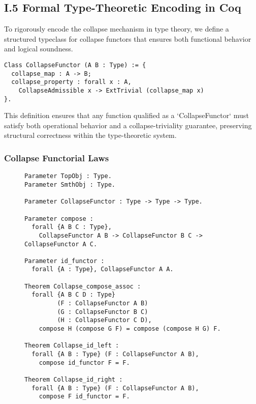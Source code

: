 \documentclass[11pt]{article}
\begin{document}
\subsection*{I.5 Formal Type-Theoretic Encoding in Coq}

To rigorously encode the collapse mechanism in type theory, we define a structured typeclass for collapse functors that ensures both functional behavior and logical soundness.

\begin{lstlisting}[language=Coq, caption={CollapseFunctor as a Typeclass with Structural Guarantees}]
Class CollapseFunctor (A B : Type) := {
  collapse_map : A -> B;
  collapse_property : forall x : A,
    CollapseAdmissible x -> ExtTrivial (collapse_map x)
}.
\end{lstlisting}

This definition ensures that any function qualified as a `CollapseFunctor` must satisfy both operational behavior and a collapse-triviality guarantee, preserving structural correctness within the type-theoretic system.


\subsubsection*{Collapse Functorial Laws}

\begin{figure}[H]
\centering
\begin{lstlisting}[language=Coq, mathescape=false, caption={Collapse Functorial Laws in Coq}]
Parameter TopObj : Type.
Parameter SmthObj : Type.

Parameter CollapseFunctor : Type -> Type -> Type.

Parameter compose :
  forall {A B C : Type},
    CollapseFunctor A B -> CollapseFunctor B C -> CollapseFunctor A C.

Parameter id_functor :
  forall {A : Type}, CollapseFunctor A A.

Theorem Collapse_compose_assoc :
  forall {A B C D : Type}
         (F : CollapseFunctor A B)
         (G : CollapseFunctor B C)
         (H : CollapseFunctor C D),
    compose H (compose G F) = compose (compose H G) F.

Theorem Collapse_id_left :
  forall {A B : Type} (F : CollapseFunctor A B),
    compose id_functor F = F.

Theorem Collapse_id_right :
  forall {A B : Type} (F : CollapseFunctor A B),
    compose F id_functor = F.
\end{lstlisting}
\end{figure}
\end{document}
